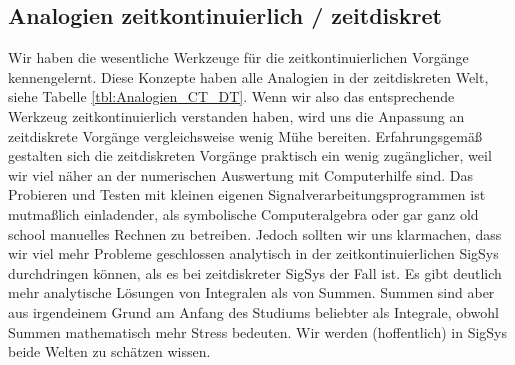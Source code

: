 \subsection*{Analogien zeitkontinuierlich / zeitdiskret}
%
Wir haben die wesentliche Werkzeuge für die zeitkontinuierlichen Vorgänge
kennengelernt. Diese Konzepte haben alle Analogien in der zeitdiskreten Welt,
siehe Tabelle \ref{tbl:Analogien_CT_DT}.
%
Wenn wir also das entsprechende Werkzeug zeitkontinuierlich verstanden haben,
wird uns die Anpassung an zeitdiskrete Vorgänge vergleichsweise wenig Mühe
bereiten. Erfahrungsgemäß gestalten sich die zeitdiskreten Vorgänge praktisch
ein wenig zugänglicher, weil wir viel näher an der numerischen Auswertung
mit Computerhilfe sind.
%
Das Probieren und Testen mit kleinen eigenen Signalverarbeitungsprogrammen
ist mutmaßlich einladender, als symbolische Computeralgebra oder gar
ganz old school manuelles Rechnen zu betreiben.
%
Jedoch sollten wir uns klarmachen, dass wir viel mehr Probleme geschlossen analytisch
in der zeitkontinuierlichen SigSys durchdringen können, als es bei zeitdiskreter
SigSys der Fall ist.
%
Es gibt deutlich mehr analytische Lösungen von Integralen als von
Summen.
%
Summen sind aber aus irgendeinem Grund am Anfang des Studiums beliebter als
Integrale, obwohl Summen mathematisch mehr Stress bedeuten.
%
Wir werden (hoffentlich) in SigSys beide Welten zu schätzen wissen.
%
%
